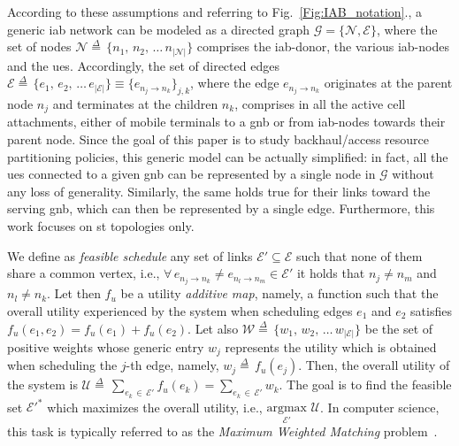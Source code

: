 According to these assumptions and referring to Fig.~\ref{Fig:IAB_notation}., a generic \gls{iab} network can be modeled as a directed graph $\mathcal{G} = \{\mathcal{N},  \mathcal{E} \}$, where the set of nodes $\mathcal{N} \mathop = \limits^{\Delta} \, \{ n_1, \, n_2, \, \ldots \, n_{\vert \mathcal{N} \vert }  \}$ comprises the \gls{iab}-donor, the various \gls{iab}-nodes and the \glspl{ue}. 
Accordingly, the set of directed edges $\mathcal{E} \mathop = \limits^{\Delta} \, \{ e_{1} , \, e_{2}, \, \ldots \, \allowbreak e_{\vert \mathcal{E} \vert} \} \equiv \{ e_{n_j \to n_k} \}_{j, k} $, where the edge $e_{n_j \to n_k}$ originates at the parent node $n_j$ and terminates at the children $n_k$, comprises in all the active cell attachments, either of mobile terminals to a \gls{gnb} or from \gls{iab}-nodes towards their parent node.
Since the goal of this paper is to study backhaul/access resource partitioning policies, this generic model can be actually simplified: in fact, all the \glspl{ue} connected to a given \gls{gnb} can be represented by a single node in $\mathcal{G}$ without any loss of generality. Similarly, the same holds true for their links toward the serving \gls{gnb}, which can then be represented by a single edge. 
Furthermore, this work focuses on \gls{st} topologies only. 

We define as \textit{feasible schedule} any set of links $\mathcal{E'} \subseteq \mathcal{E}$ such that none of them share a common vertex, i.e., $ \forall \, e_{n_j \to n_k} \neq e_{n_l \to n_m} \in \mathcal{E'}$ it holds that $n_{j} \neq n_{m}$ and $n_{l} \neq n_{k}$. Let then $f_u$ be a utility \textit{additive map}, namely, a function such that the overall utility experienced by the system when scheduling edges $e_1$ and $e_2$ satisfies $f_u (e_1, e_2) = f_u (e_1) + f_u(e_2)$. Let also $\mathcal{W} \mathop = \limits^{\Delta} \, \{ w_1, \, w_2, \, \ldots \, w_{\vert \mathcal{E} \vert } \}$ be the set of positive weights whose generic entry $w_j$ represents the utility which is obtained when scheduling the $j$-th edge, namely, $w_j \mathop = \limits^{\Delta} \, f_u (e_j)$. Then, the overall utility of the system is $\mathcal{U} \mathop = \limits^{\Delta} \, \sum_{e_k \, \in \, \mathcal{E'}} f_u(e_k) = \sum_{e_k \, \in \, \mathcal{E'}} w_k $.
The goal is to find the feasible set $\mathcal{E'}^{*}$ which maximizes the overall utility, i.e., $\underset{\mathcal{E'}}{\mathrm{argmax}} \,\, \mathcal{U} $. In computer science, this task is typically referred to as the \textit{Maximum Weighted Matching} problem~\cite{Korte2002}.

